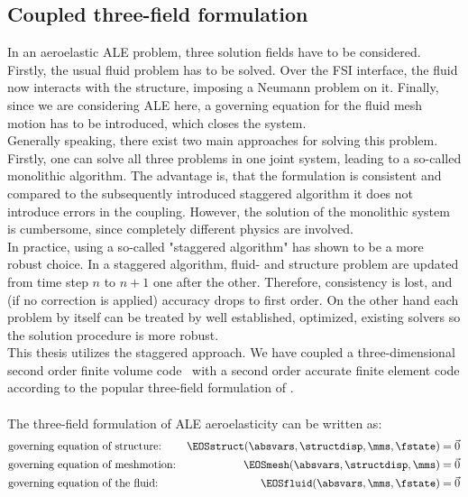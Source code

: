 \documentclass[../main.tex]{subfiles}
\begin{document}
\subsection{Coupled three-field formulation}\label{sec:3_field_formulation}
In an aeroelastic ALE problem, three solution fields have to be considered. Firstly, the usual fluid problem has to be solved. Over the \ac{FSI} interface, the fluid now interacts with the structure, imposing a Neumann problem on it. Finally, since we are considering \ac{ALE} here, a governing equation for the fluid mesh motion has to be introduced, which closes the system.\\
Generally speaking, there exist two main approaches for solving this problem. Firstly, one can solve all three problems in one joint system, leading to a so-called monolithic algorithm. The advantage is, that the formulation is consistent and compared to the subsequently introduced staggered algorithm it does not introduce errors in the coupling. However, the solution of the monolithic system is cumbersome, since completely different physics are involved.\\
In practice, using a so-called "staggered algorithm" has shown to be a more robust choice. In a staggered algorithm, fluid- and structure problem are updated from time step $n$ to $n+1$ one after the other. Therefore, consistency is lost, and (if no correction is applied) accuracy drops to first order. On the other hand each problem by itself can be treated by well established, optimized, existing solvers so the solution procedure is more robust.\\
This thesis utilizes the staggered approach. We have coupled a three-dimensional second order finite volume code~\cite{Aerof} with a second order accurate finite element code\cite{Aeros} according to the popular three-field formulation of \cite{Farhat1995}.\\
 \\
The three-field formulation of \ac{ALE} aeroelasticity can be written as:
\begin{align}
&\text{governing equation of structure:}  &\EOSstruct (\absvars,\structdisp,\mms,\fstate) = \vec{0} \label{eq:3field_structure}\\
&\text{governing equation of meshmotion:} &\EOSmesh   (\absvars,\structdisp,\mms)         = \vec{0} \label{eq:3field_mesh}\\
&\text{governing equation of the fluid:}  &\EOSfluid  (\absvars,\mms,\fstate)             = \vec{0}
\label{eq:3field_fluid}\\
\end{align}
\end{document}
